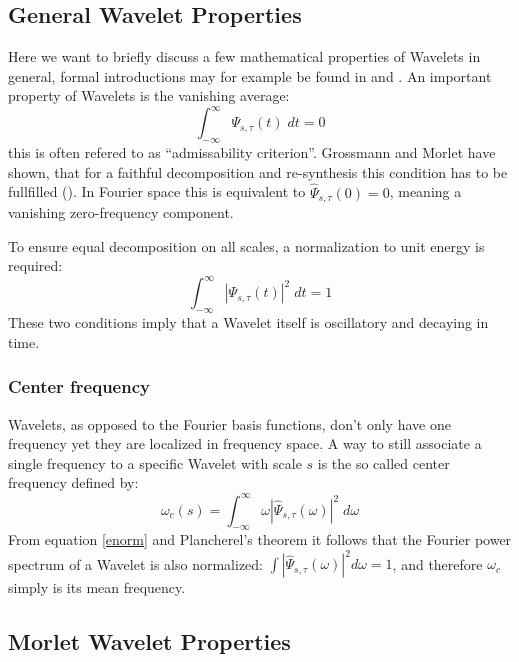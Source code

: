 \subsection{General Wavelet Properties}

Here we want to briefly discuss a few mathematical properties of Wavelets in general, formal introductions may for example be found in \cite{Daubechies1992} and \cite{Mallat1999}. An important property of Wavelets is the vanishing average:
\begin{equation}
  \int_{-\infty}^{\infty} \Psi_{s,\tau}(t) \;dt = 0
\end{equation}
this is often refered to as ``admissability criterion''. Grossmann and Morlet have shown, that for a faithful decomposition and re-synthesis this condition has to be fullfilled (\cite{Grossmann1985}). In Fourier space this is equivalent to $\widehat{\Psi}_{s,\tau}(0) = 0$, meaning a vanishing zero-frequency component.

To ensure equal decomposition on all scales, a normalization to unit energy is required:
\begin{equation}
  \label{enorm}
  \int_{-\infty}^{\infty} |\Psi_{s,\tau}(t)|^2 \;dt = 1
\end{equation}
These two conditions imply that a Wavelet itself is oscillatory and decaying in time.

\subsubsection{Center frequency}
\label{cfreq}
Wavelets, as opposed to the Fourier basis functions, don't only have one frequency yet they are localized in frequency space. A way to still associate a single frequency to a specific Wavelet with scale $s$ is the so called center frequency defined by:
\begin{equation}
  \label{cfreq_eq}
  \omega_c(s) =  \int_{-\infty}^{\infty} \omega |\widehat{\Psi}_{s,\tau}(\omega)|^2\;d\omega
\end{equation}
From equation \ref{enorm} and Plancherel's theorem it follows that the Fourier power spectrum of a Wavelet is also normalized: $\int |\widehat{\Psi}_{s,\tau}(\omega)|^2 d\omega = 1$, and therefore $\omega_c$ simply is its mean frequency.

\subsection{Morlet Wavelet Properties}

